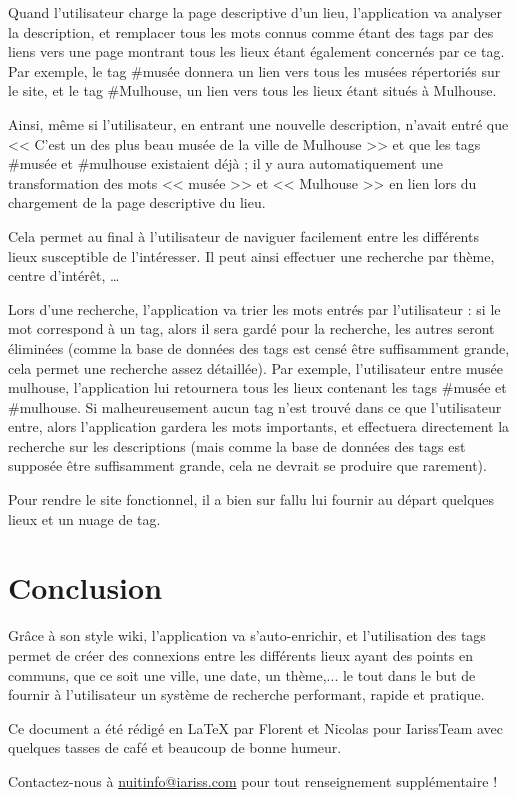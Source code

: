 \documentclass[12pt, a4paper]{article}
\newcommand{\espace}{\vspace{.8cm}}
\newcommand{\authors}{Florent et Nicolas}
\begin{document}
Quand l'utilisateur charge la page descriptive d'un lieu, l'application va analyser la description, et remplacer tous les mots connus comme étant des tags par des liens vers une page montrant tous les lieux étant également concernés par ce tag. Par exemple, le tag \#musée donnera un lien vers tous les musées répertoriés sur le site, et le tag \#Mulhouse, un lien vers tous les lieux étant situés à Mulhouse.

Ainsi, même si l'utilisateur, en entrant une nouvelle description, n'avait entré que << C'est un des plus beau musée de la ville de Mulhouse >> et que les tags \#musée et \#mulhouse existaient déjà ; il y aura automatiquement une transformation des mots << musée >> et << Mulhouse >> en lien lors du chargement de la page descriptive du lieu.

Cela permet au final à l'utilisateur de naviguer facilement entre les différents lieux susceptible de l'intéresser. Il peut ainsi effectuer une recherche par thème, centre d'intérêt, \ldots{}

\espace{}
Lors d'une recherche, l'application va trier les mots entrés par l'utilisateur : si le mot correspond à un tag, alors il sera gardé pour la recherche, les autres seront éliminées (comme la base de données des tags est censé être suffisamment grande, cela permet une recherche assez détaillée). Par exemple, l'utilisateur entre \og{}musée mulhouse\fg{}, l'application lui retournera tous les lieux contenant les tags \#musée et \#mulhouse. Si malheureusement aucun tag n'est trouvé dans ce que l'utilisateur entre, alors l'application gardera les mots importants, et effectuera directement la recherche sur les descriptions (mais comme la base de données des tags est supposée être suffisamment grande, cela ne devrait se produire que rarement).

\espace{}
Pour rendre le site fonctionnel, il a bien sur fallu lui fournir au départ quelques lieux et un nuage de tag.

\espace{}
\section{Conclusion}
Grâce à son style wiki, l'application va s'auto-enrichir, et l'utilisation des tags permet de créer des connexions entre les différents lieux ayant des points en communs, que ce soit une ville, une date, un thème,... le tout dans le but de fournir à l'utilisateur un système de recherche performant, rapide et pratique.


\espace\vfill{}
Ce document a été rédigé en \LaTeX{} par \authors{} pour IarissTeam avec quelques tasses de café et beaucoup de bonne humeur.

Contactez-nous à \href{mailto:nuitinfo@iariss.com}{nuitinfo@iariss.com} pour tout renseignement supplémentaire !
\end{document}
